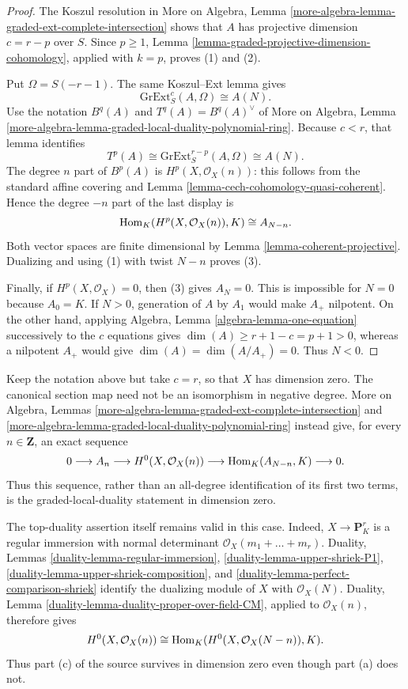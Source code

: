 \begin{proof}
The Koszul resolution in More on Algebra, Lemma
\ref{more-algebra-lemma-graded-ext-complete-intersection} shows that
$A$ has projective dimension $c=r-p$ over $S$. Since $p\geq1$, Lemma
\ref{lemma-graded-projective-dimension-cohomology}, applied with $k=p$,
proves (1) and (2).

Put $\Omega=S(-r-1)$. The same Koszul--Ext lemma gives
$$
\text{GrExt}^c_S(A,\Omega)\cong A(N).
$$
Use the notation $B^q(A)$ and $T^q(A)=B^q(A)^\vee$ of More on Algebra,
Lemma \ref{more-algebra-lemma-graded-local-duality-polynomial-ring}.
Because $c<r$, that lemma identifies
$$
T^p(A)\cong\text{GrExt}^{r-p}_S(A,\Omega)\cong A(N).
$$
The degree $n$ part of $B^p(A)$ is
$H^p(X,\mathcal O_X(n))$: this follows from the standard affine covering
and Lemma \ref{lemma-cech-cohomology-quasi-coherent}. Hence the degree
$-n$ part of the last display is
$$
\mathop{\mathrm{Hom}}\nolimits_K(H^p(X,\mathcal O_X(n)),K)\cong A_{N-n}.
$$
Both vector spaces are finite dimensional by Lemma
\ref{lemma-coherent-projective}. Dualizing and using (1) with twist $N-n$
proves (3).

Finally, if $H^p(X,\mathcal O_X)=0$, then (3) gives $A_N=0$. This is
impossible for $N=0$ because $A_0=K$. If $N>0$, generation of $A$ by
$A_1$ would make $A_+$ nilpotent. On the other hand, applying Algebra,
Lemma \ref{algebra-lemma-one-equation} successively to the $c$ equations
gives $\dim(A)\geq r+1-c=p+1>0$, whereas a nilpotent $A_+$ would give
$\dim(A)=\dim(A/A_+)=0$. Thus $N<0$.
\end{proof}

\begin{remark}
\label{remark-projective-complete-intersection-dimension-zero}
Keep the notation above but take $c=r$, so that $X$ has dimension zero.
The canonical section map need not be an isomorphism in negative degree.
More on Algebra, Lemmas
\ref{more-algebra-lemma-graded-ext-complete-intersection} and
\ref{more-algebra-lemma-graded-local-duality-polynomial-ring} instead give,
for every $n\in\mathbf Z$, an exact sequence
$$
0\longrightarrow A_n\longrightarrow H^0(X,\mathcal O_X(n))
\longrightarrow\mathop{\mathrm{Hom}}\nolimits_K(A_{N-n},K)\longrightarrow0.
$$
Thus this sequence, rather than an all-degree identification of its first
two terms, is the graded-local-duality statement in dimension zero.

The top-duality assertion itself remains valid in this case. Indeed,
$X\to\mathbf P^r_K$ is a regular immersion with normal determinant
$\mathcal O_X(m_1+\ldots+m_r)$. Duality, Lemmas
\ref{duality-lemma-regular-immersion},
\ref{duality-lemma-upper-shriek-P1},
\ref{duality-lemma-upper-shriek-composition}, and
\ref{duality-lemma-perfect-comparison-shriek} identify the dualizing module
of $X$ with $\mathcal O_X(N)$. Duality, Lemma
\ref{duality-lemma-duality-proper-over-field-CM}, applied to
$\mathcal O_X(n)$, therefore gives
$$
H^0(X,\mathcal O_X(n))\cong
\mathop{\mathrm{Hom}}\nolimits_K(H^0(X,\mathcal O_X(N-n)),K).
$$
Thus part (c) of the source survives in dimension zero even though part (a)
does not.
\end{remark}


